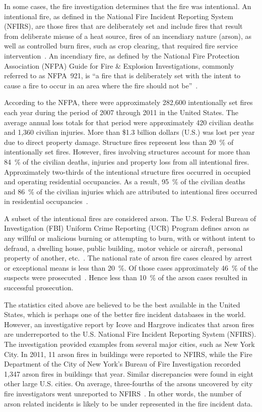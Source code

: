 \documentclass[twoside]{uocthesis}
\begin{document}
In some cases, the fire investigation determines that the fire was intentional.  An intentional fire, as defined in the National Fire Incident Reporting System (NFIRS), are those fires that are deliberately set and include fires that result from deliberate misuse of a heat source, fires of an incendiary nature (arson), as well as controlled burn fires, such as crop clearing, that required fire service intervention~\cite{Campbell:2014}.  An incendiary fire, as defined by the National Fire Protection Association (NFPA) Guide for Fire \& Explosion Investigations, commonly referred to as NFPA~921, is ``a fire that is deliberately set with the intent to cause a fire to occur in an area where the fire should not be''~\cite{NFPA:921}.

According to the NFPA, there were approximately 282,600 intentionally set fires each year during the period of 2007 through 2011 in the United States. The average annual loss totals for that period were approximately 420 civilian deaths and 1,360 civilian injuries. More than \$1.3 billion dollars (U.S.) was lost per year due to direct property damage. Structure fires represent less than 20~\% of intentionally set fires.  However, fires involving structures account for more than 84~\% of the civilian deaths, injuries and property loss from all intentional fires.  Approximately two-thirds of the intentional structure fires occurred in occupied and operating residential occupancies.  As a result, 95~\% of the civilian deaths and 86~\% of the civilian injuries which are attributed to intentional fires occurred in residential occupancies~\cite{Campbell:2014}.

A subset of the intentional fires are considered arson.  The U.S. Federal Bureau of Investigation (FBI) Uniform Crime Reporting (UCR) Program defines arson as any willful or malicious burning or attempting to burn, with or without intent to defraud, a dwelling house, public building, motor vehicle or aircraft, personal property of another, etc.~\cite{Crime:2010}.  The national rate of arson fire cases cleared by arrest or exceptional means is less than 20~\%.  Of those cases approximately 46~\% of the suspects were prosecuted~\cite{Campbell:2014}.  Hence less than 10~\% of the arson cases resulted in successful prosecution.   

The statistics cited above are believed to be the best available in the United States, which is perhaps one of the better fire incident databases in the world.  However, an investigative report by Icove and Hargrove indicates that arson fires are underreported to the U.S. National Fire Incident Reporting System (NFIRS).  The investigation provided examples from several major cities, such as New York City. In 2011, 11 arson fires in buildings were reported to NFIRS, while the Fire Department of the City of New York's Bureau of Fire Investigation recorded 1,347 arson fires in buildings that year.  Similar discrepancies were found in eight other large U.S. cities.  On average, three-fourths of the arsons uncovered by city fire investigators went unreported to NFIRS~\cite{Icove_2014}.  In other words, the number of arson related incidents is likely to be under represented in the fire incident data.  
\end{document}
